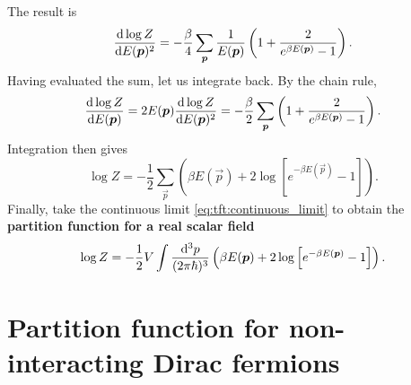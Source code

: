 The result is
\begin{equation}
	\odv{\log Z}{E(\vec{p})^2} = -\frac{\beta}{4} \sum_\vec{p} \frac{1}{E(\vec{p})} \left( 1 + \frac{2}{e^{\beta E(\vec{p})} - 1} \right) .
\end{equation}
Having evaluated the sum, let us integrate back.
By the chain rule,
\begin{equation}
	\odv{\log Z}{E(\vec{p})} = 
	2 E(\vec{p}) \odv{\log Z}{E(\vec{p})^2} = 
	-\frac{\beta}{2} \sum_{\vec{p}} \left( 1 + \frac{2}{e^{\beta E(\vec{p})} - 1} \right) .
\end{equation}
Integration then gives
\begin{equation}
	\log Z = -\frac{1}{2} \sum_\vec{p} \left( \beta E(\vec{p}) + 2 \log \left[ e^{-\beta E(\vec{p})} - 1 \right] \right) .
\end{equation}
Finally, take the continuous limit \eqref{eq:tft:continuous_limit} to obtain the \textbf{partition function for a real scalar field}
\begin{equation}
	\log Z = -\frac{1}{2} V \int \frac{\mathop{}\!\mathrm{d}^3 p}{(2 \pi \hbar)^3} \left( \beta E({\bm{p}}) + 2 \log \left[ e^{-\beta E({\bm{p}})} - 1 \right] \right) .
\end{equation}



\section{Partition function for non-interacting Dirac fermions}


